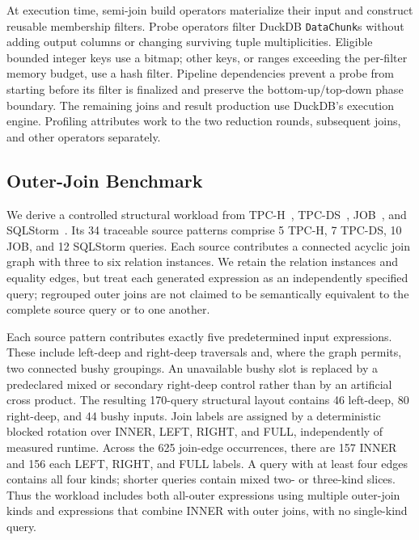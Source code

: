 At execution time, semi-join build operators materialize their input and
construct reusable membership filters. Probe operators filter DuckDB
\texttt{DataChunk}s without adding output columns or changing surviving
tuple multiplicities. Eligible bounded integer keys use a bitmap; other
keys, or ranges exceeding the per-filter memory budget, use a hash filter.
Pipeline dependencies prevent a probe from starting before its filter is
finalized and preserve the bottom-up/top-down phase boundary. The remaining
joins and result production use DuckDB's execution engine. Profiling
attributes work to the two reduction rounds, subsequent joins, and other
operators separately.

\subsection{Outer-Join Benchmark}
\label{sec:outerjoin-benchmark}

We derive a controlled structural workload from TPC-H~\cite{tpch},
TPC-DS~\cite{tpcds}, JOB~\cite{job}, and SQLStorm~\cite{sqlstorm25}.
Its 34 traceable source patterns comprise 5 TPC-H, 7 TPC-DS, 10 JOB, and
12 SQLStorm queries. Each source contributes a connected acyclic join graph
with three to six relation instances. We retain the relation instances and
equality edges, but treat each generated expression as an independently
specified query; regrouped outer joins are not claimed to be semantically
equivalent to the complete source query or to one another.

Each source pattern contributes exactly five predetermined input expressions.
These include left-deep and right-deep traversals and, where the graph permits,
two connected bushy groupings. An unavailable bushy slot is replaced by a
predeclared mixed or secondary right-deep control rather than by an artificial
cross product. The resulting 170-query structural layout contains 46
left-deep, 80 right-deep, and 44 bushy inputs. Join labels are assigned by a
deterministic blocked rotation over INNER, LEFT, RIGHT, and FULL, independently
of measured runtime. Across the 625 join-edge occurrences, there are 157 INNER
and 156 each LEFT, RIGHT, and FULL labels. A query with at least four edges
contains all four kinds; shorter queries contain mixed two- or three-kind
slices. Thus the workload includes both all-outer expressions using multiple
outer-join kinds and expressions that combine INNER with outer joins, with no
single-kind query.

